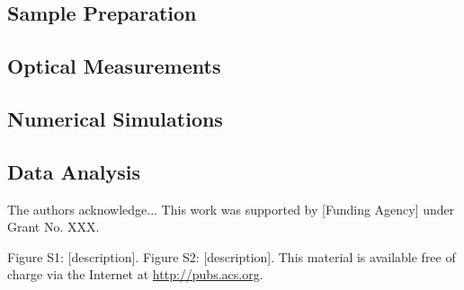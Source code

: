 \documentclass[journal=apchd5,manuscript=article]{achemso}
\begin{document}
\subsection{Sample Preparation}

\subsection{Optical Measurements}

\subsection{Numerical Simulations}

\subsection{Data Analysis}

\begin{acknowledgement}
The authors acknowledge...
This work was supported by [Funding Agency] under Grant No. XXX.
\end{acknowledgement}



\begin{suppinfo}
Figure S1: [description].
Figure S2: [description].
This material is available free of charge via the Internet at \url{http://pubs.acs.org}.
\end{suppinfo}


\end{document}
